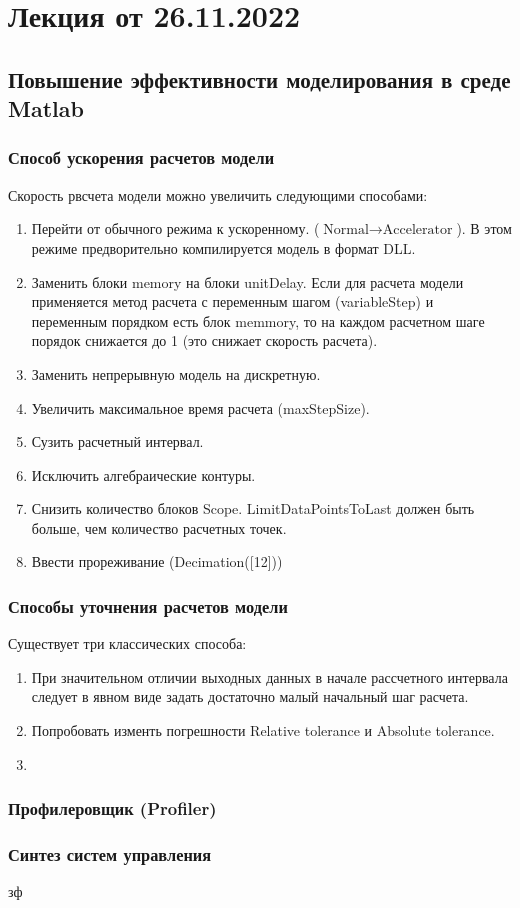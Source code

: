 
\section{Лекция от 26.11.2022}
\subsection{Повышение эффективности моделирования в среде Matlab}
\subsubsection{Способ ускорения расчетов модели}
Скорость рвсчета модели можно увеличить следующими способами:
\begin{enumerate}
  \item Перейти от обычного режима к ускоренному. ($\text{Normal} \to
    \text{Accelerator}$). В этом режиме предворительно компилируется модель в
    формат DLL. 
  \item Заменить блоки memory на блоки unitDelay. Если для расчета модели
    применяется метод расчета с переменным шагом (variableStep) и переменным
    порядком есть блок memmory, то на каждом расчетном шаге порядок снижается
    до 1 (это снижает скорость расчета).
  \item Заменить непрерывную модель на дискретную.
  \item Увеличить максимальное время расчета (maxStepSize).
  \item Сузить расчетный интервал.
  \item Исключить алгебраические контуры.
  \item Снизить количество блоков Scope. LimitDataPointsToLast должен быть
    больше, чем количество расчетных точек.
  \item Ввести прореживание (Decimation([12]))
\end{enumerate}

\subsubsection{Способы уточнения расчетов модели}
Существует три классических способа:
\begin{enumerate}
  \item При значительном отличии выходных данных в начале рассчетного интервала
    следует в явном виде задать достаточно малый начальный шаг расчета.
  \item Попробовать изменть погрешности Relative tolerance и Absolute tolerance.
  \item 
\end{enumerate}

\subsubsection{Профилеровщик (Profiler)}

\subsubsection{Синтез систем управления}
зф
